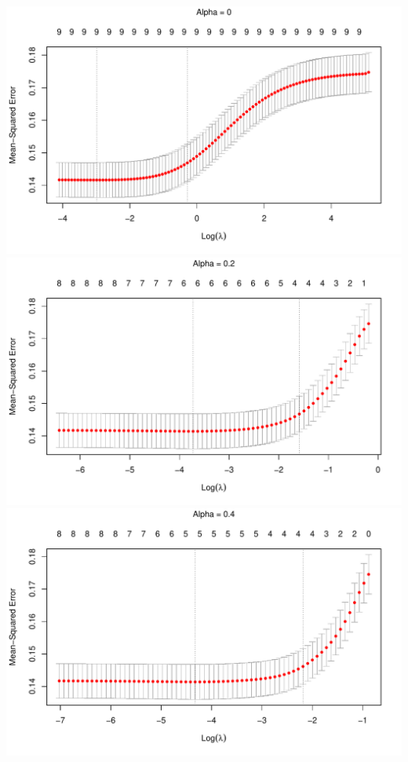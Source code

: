 \documentclass[
]{article}
\begin{document}
\includegraphics[width=\textwidth]{A2_files/figure-latex/unnamed-chunk-7-1}
\includegraphics[width=\textwidth]{A2_files/figure-latex/unnamed-chunk-7-2}
\includegraphics[width=\textwidth]{A2_files/figure-latex/unnamed-chunk-7-3}
\end{document}
